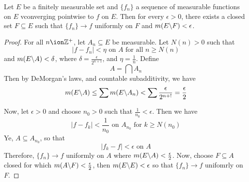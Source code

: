 \begin{theorem}\label{9.3.2}
    Let $E$ be a finitely measurable set and  $\{f_n\}$ a sequence of measurable
    functions on $E$ vconverging pointwise to $f$ on  $E$. Then for every
    $\epsilon>0$, there exists a closed set  $F \subseteq E$ such that  $\{f_n\}
    \xrightarrow{} f$ uniformly on $F$ and  $m(E \backslash F)<\epsilon$.
\end{theorem}
\begin{proof}
    For all $n \ion \Z^+$, let  $A_n \subseteq E$ be measurable. Let $N(n)>0$
    such that
    \begin{equation*}
        |f-f_n|<\eta \text{ on } A \text{ for all } n \geq N(n)
    \end{equation*}
    and $m(E \backslash A)<\delta$, where $\delta=\frac{\epsilon}{2^{n+1}}$, and
    $\eta=\frac{1}{n}$. Define
    \begin{equation*}
        A=\bigcap{A_n}
    \end{equation*}
    Then by DeMorgan's laws, and countable subadditivity, we have
    \begin{equation*}
        m(E \backslash A) \leq
        \sum{m(E \backslash A_n)}<\sum{\frac{\epsilon}{2^{n+!}}}=\frac{\epsilon}{2}
    \end{equation*}

    Now, let $\epsilon>0$ and choose $n_0>0$ such that $\frac{1}{n_0}<\epsilon$.
    Then we have
    \begin{equation*}
        |f-f_k|<\frac{1}{n_0} \text{ on } A_{n_0} \text{ for } k \geq N(n_0)
    \end{equation*}
    Ye, $A \subseteq A_{n_0}$, so that
    \begin{equation*}
        |f_k-f|<\epsilon \text{ on } A
    \end{equation*}
    Therefore, $\{f_n\} \xrightarrow{} f$ uniformly on $A$ where
    $m(E \backslash A)<\frac{\epsilon}{2}$. Now, choose $F \subseteq A$ closed for
    which $m(A \backslash F)<\frac{\epsilon}{2}$, then $m(E \backslash E)<\epsilon$ so
    that $\{f_n\} \xrightarrow{} f$ unifomrly on $F$.
\end{proof}

